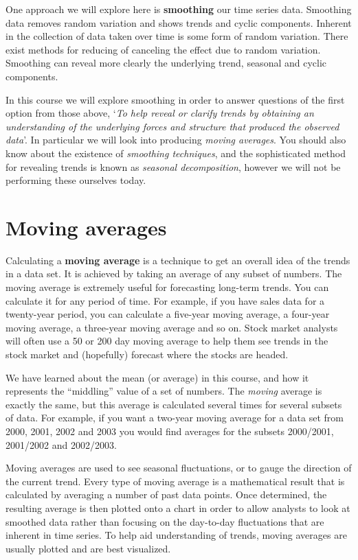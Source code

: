 \documentclass[
]{book}
\begin{document}
One approach we will explore here is \textbf{smoothing} our time series data. Smoothing data removes random variation and shows trends and cyclic components. Inherent in the collection of data taken over time is some form of random variation. There exist methods for reducing of canceling the effect due to random variation. Smoothing can reveal more clearly the underlying trend, seasonal and cyclic components.

In this course we will explore smoothing in order to answer questions of the first option from those above, `\emph{To help reveal or clarify trends by obtaining an understanding of the underlying forces and structure that produced the observed data}'. In particular we will look into producing \emph{moving averages}. You should also know about the existence of \emph{smoothing techniques}, and the sophisticated method for revealing trends is known as \emph{seasonal decomposition}, however we will not be performing these ourselves today.

\hypertarget{moving-averages}{%
\section{Moving averages}\label{moving-averages}}

Calculating a \textbf{moving average} is a technique to get an overall idea of the trends in a data set. It is achieved by taking an average of any subset of numbers. The moving average is extremely useful for forecasting long-term trends. You can calculate it for any period of time. For example, if you have sales data for a twenty-year period, you can calculate a five-year moving average, a four-year moving average, a three-year moving average and so on. Stock market analysts will often use a 50 or 200 day moving average to help them see trends in the stock market and (hopefully) forecast where the stocks are headed.

We have learned about the mean (or average) in this course, and how it represents the ``middling'' value of a set of numbers. The \emph{moving} average is exactly the same, but this average is calculated several times for several subsets of data. For example, if you want a two-year moving average for a data set from 2000, 2001, 2002 and 2003 you would find averages for the subsets 2000/2001, 2001/2002 and 2002/2003.

Moving averages are used to see seasonal fluctuations, or to gauge the direction of the current trend. Every type of moving average is a mathematical result that is calculated by averaging a number of past data points. Once determined, the resulting average is then plotted onto a chart in order to allow analysts to look at smoothed data rather than focusing on the day-to-day fluctuations that are inherent in time series. To help aid understanding of trends, moving averages are usually plotted and are best visualized.
\end{document}
